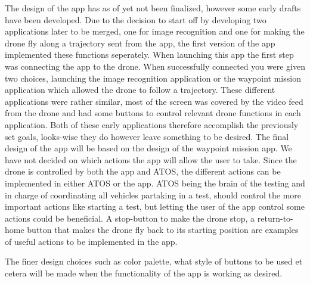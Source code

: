 The design of the app has as of yet not been finalized, however some early drafts have been developed. Due to the decision to start off by developing two applications later to be merged, one for image recognition and one for making the drone fly along a trajectory sent from the app, the first version of the app implemented these functions seperately. When launching this app the first step was connecting the app to the drone. When successfully connected you were given two choices, launching the image recognition application or the waypoint mission application which allowed the drone to follow a trajectory. These different applications were rather similar, most of the screen was covered by the video feed from the drone and had some buttons to control relevant drone functions in each application. Both of these early applications therefore accomplish the previously set goals, looks-wise they do however leave something to be desired. The final design of the app will be based on the design of the waypoint mission app. We have not decided on which actions the app will allow the user to take. Since the drone is controlled by both the app and ATOS, the different actions can be implemented in either ATOS or the app. ATOS being the brain of the testing and in charge of coordinating all vehicles partaking in a test, should control the more important actions like starting a test, but letting the user of the app control some actions could be beneficial. A stop-button to make the drone stop, a return-to-home button that makes the drone fly back to its starting position are examples of useful actions to be implemented in the app. 

The finer design choices such as color palette, what style of buttons to be used et cetera will be made when the functionality of the app is working as desired.


